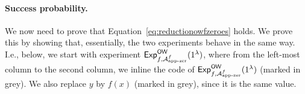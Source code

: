 \documentclass[a4paper,table,dvipsnames]{article}
\theoremstyle{definition}
\begin{document}
\paragraph{Success probability.}
We now need to prove that Equation~\ref{eq:reductionowfzeroes} holds. We prove this by showing that, essentially, the two experiments behave in the same way. I.e., below, we start with experiment ${\mathsf{Exp}}_{f,\mathcal{A}^f_{\text{app-zer}}}^{\mathsf{OW}}(1^\lambda)$, where from the left-most column to the second column, we inline the code of ${\mathsf{Exp}}_{f,\mathcal{A}^f_{\text{app-zer}}}^{\mathsf{OW}}(1^\lambda)$ (marked in grey). We also replace $y$ by $f(x)$ (marked in grey), since it is the same value.
\begin{center}
\begin{pchstack}
		    \pchspace
		\pchspace
\end{pchstack}
\end{center}
\end{document}
